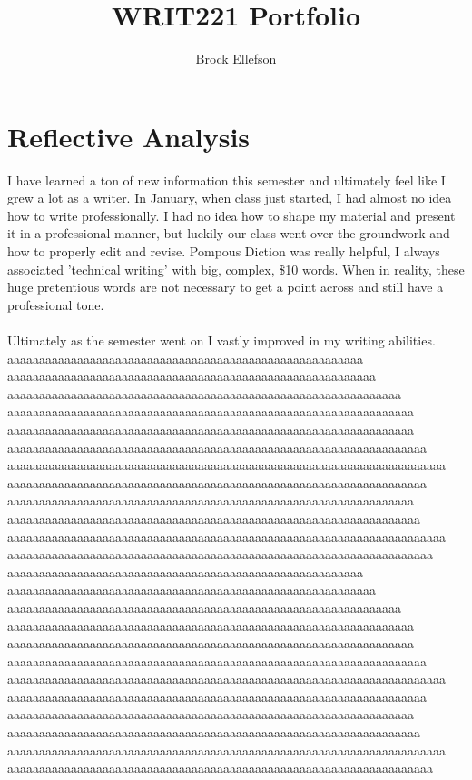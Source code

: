 \documentclass[12pt,letterpaper]{article}
\author{Brock Ellefson}
\title{WRIT221 Portfolio}
\begin{document}
\maketitle
\newpage
\doublespacing
\newpage
\tableofcontents
\newpage
\section{Reflective Analysis}
I have learned a ton of new information this semester and ultimately feel like I grew a lot as a writer. In January, when class just started, I had almost no idea how to write professionally. I had no idea how to shape my material and present it in a professional manner, but luckily our class went over the groundwork and how to properly edit and revise. Pompous Diction was really helpful, I always associated 'technical writing' with big, complex, \$10 words. When in reality, these huge pretentious words are not necessary to get a point across and still have a professional tone.\\
\\
Ultimately as the semester went on I vastly improved in my writing abilities. 
aaaaaaaaaaaaaaaaaaaaaaaaaaaaaaaaaaaaaaaaaaaaaaaaaaaaaaaa aaaaaaaaaaaaaaaaaaaaaaaaaaaaaaaaaaaaaaaaaaaaaaaaaaaaaaaaaa aaaaaaaaaaaaaaaaaaaaaaaaaaaaaaaaaaaaaaaaaaaaaaaaaaaaaaaaaaaaaa aaaaaaaaaaaaaaaaaaaaaaaaaaaaaaaaaaaaaaaaaaaaaaaaaaaaaaaaaaaaaaaa aaaaaaaaaaaaaaaaaaaaaaaaaaaaaaaaaaaaaaaaaaaaaaaaaaaaaaaaaaaaaaaa aaaaaaaaaaaaaaaaaaaaaaaaaaaaaaaaaaaaaaaaaaaaaaaaaaaaaaaaaaaaaaaaaa aaaaaaaaaaaaaaaaaaaaaaaaaaaaaaaaaaaaaaaaaaaaaaaaaaaaaaaaaaaaaaaaaaaaa aaaaaaaaaaaaaaaaaaaaaaaaaaaaaaaaaaaaaaaaaaaaaaaaaaaaaaaaaaaaaaaaaa aaaaaaaaaaaaaaaaaaaaaaaaaaaaaaaaaaaaaaaaaaaaaaaaaaaaaaaaaaaaaaaa aaaaaaaaaaaaaaaaaaaaaaaaaaaaaaaaaaaaaaaaaaaaaaaaaaaaaaaaaaaaaaaaa aaaaaaaaaaaaaaaaaaaaaaaaaaaaaaaaaaaaaaaaaaaaaaaaaaaaaaaaaaaaaaaaaaaaa aaaaaaaaaaaaaaaaaaaaaaaaaaaaaaaaaaaaaaaaaaaaaaaaaaaaaaaaaaaaaaaaaaa
aaaaaaaaaaaaaaaaaaaaaaaaaaaaaaaaaaaaaaaaaaaaaaaaaaaaaaaa aaaaaaaaaaaaaaaaaaaaaaaaaaaaaaaaaaaaaaaaaaaaaaaaaaaaaaaaaa aaaaaaaaaaaaaaaaaaaaaaaaaaaaaaaaaaaaaaaaaaaaaaaaaaaaaaaaaaaaaa aaaaaaaaaaaaaaaaaaaaaaaaaaaaaaaaaaaaaaaaaaaaaaaaaaaaaaaaaaaaaaaa aaaaaaaaaaaaaaaaaaaaaaaaaaaaaaaaaaaaaaaaaaaaaaaaaaaaaaaaaaaaaaaa aaaaaaaaaaaaaaaaaaaaaaaaaaaaaaaaaaaaaaaaaaaaaaaaaaaaaaaaaaaaaaaaaa aaaaaaaaaaaaaaaaaaaaaaaaaaaaaaaaaaaaaaaaaaaaaaaaaaaaaaaaaaaaaaaaaaaaa aaaaaaaaaaaaaaaaaaaaaaaaaaaaaaaaaaaaaaaaaaaaaaaaaaaaaaaaaaaaaaaaaa aaaaaaaaaaaaaaaaaaaaaaaaaaaaaaaaaaaaaaaaaaaaaaaaaaaaaaaaaaaaaaaa aaaaaaaaaaaaaaaaaaaaaaaaaaaaaaaaaaaaaaaaaaaaaaaaaaaaaaaaaaaaaaaaa aaaaaaaaaaaaaaaaaaaaaaaaaaaaaaaaaaaaaaaaaaaaaaaaaaaaaaaaaaaaaaaaaaaaa aaaaaaaaaaaaaaaaaaaaaaaaaaaaaaaaaaaaaaaaaaaaaaaaaaaaaaaaaaaaaaaaaaa
\end{document}
